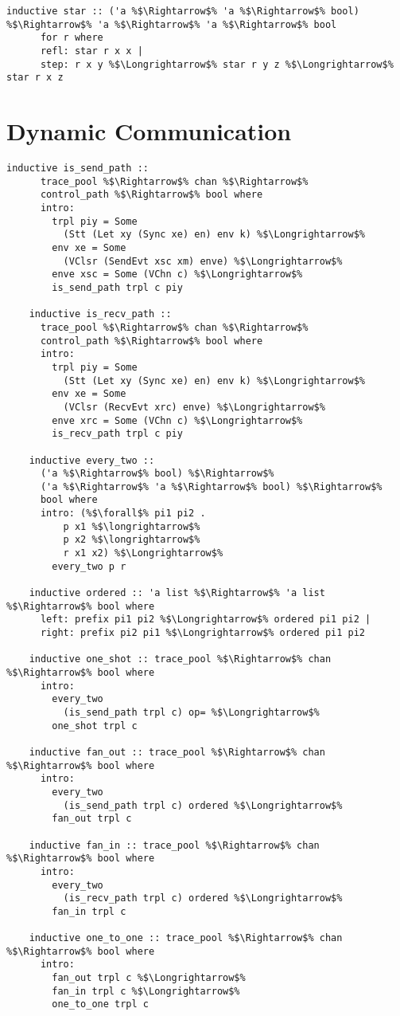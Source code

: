 \documentclass{article}
\begin{document}
  \begin{lstlisting}[style=codestyle1, escapechar=\%]
    inductive star :: ('a %$\Rightarrow$% 'a %$\Rightarrow$% bool) %$\Rightarrow$% 'a %$\Rightarrow$% 'a %$\Rightarrow$% bool
      for r where
      refl: star r x x |
      step: r x y %$\Longrightarrow$% star r y z %$\Longrightarrow$% star r x z
    \end{lstlisting}



\section{Dynamic Communication}
  
  \begin{lstlisting}[style=codestyle1, escapechar=\%]
    inductive is_send_path ::
      trace_pool %$\Rightarrow$% chan %$\Rightarrow$%
      control_path %$\Rightarrow$% bool where
      intro:
        trpl piy = Some
          (Stt (Let xy (Sync xe) en) env k) %$\Longrightarrow$%
        env xe = Some
          (VClsr (SendEvt xsc xm) enve) %$\Longrightarrow$%
        enve xsc = Some (VChn c) %$\Longrightarrow$%
        is_send_path trpl c piy

    inductive is_recv_path ::
      trace_pool %$\Rightarrow$% chan %$\Rightarrow$%
      control_path %$\Rightarrow$% bool where
      intro:
        trpl piy = Some
          (Stt (Let xy (Sync xe) en) env k) %$\Longrightarrow$%
        env xe = Some
          (VClsr (RecvEvt xrc) enve) %$\Longrightarrow$%
        enve xrc = Some (VChn c) %$\Longrightarrow$%
        is_recv_path trpl c piy

    inductive every_two ::
      ('a %$\Rightarrow$% bool) %$\Rightarrow$%
      ('a %$\Rightarrow$% 'a %$\Rightarrow$% bool) %$\Rightarrow$%
      bool where
      intro: (%$\forall$% pi1 pi2 .
          p x1 %$\longrightarrow$%
          p x2 %$\longrightarrow$%
          r x1 x2) %$\Longrightarrow$%
        every_two p r

    inductive ordered :: 'a list %$\Rightarrow$% 'a list %$\Rightarrow$% bool where
      left: prefix pi1 pi2 %$\Longrightarrow$% ordered pi1 pi2 |
      right: prefix pi2 pi1 %$\Longrightarrow$% ordered pi1 pi2

    inductive one_shot :: trace_pool %$\Rightarrow$% chan %$\Rightarrow$% bool where
      intro:
        every_two
          (is_send_path trpl c) op= %$\Longrightarrow$% 
        one_shot trpl c

    inductive fan_out :: trace_pool %$\Rightarrow$% chan %$\Rightarrow$% bool where
      intro:
        every_two
          (is_send_path trpl c) ordered %$\Longrightarrow$%
        fan_out trpl c
  
    inductive fan_in :: trace_pool %$\Rightarrow$% chan %$\Rightarrow$% bool where
      intro:
        every_two
          (is_recv_path trpl c) ordered %$\Longrightarrow$% 
        fan_in trpl c

    inductive one_to_one :: trace_pool %$\Rightarrow$% chan %$\Rightarrow$% bool where
      intro:
        fan_out trpl c %$\Longrightarrow$%
        fan_in trpl c %$\Longrightarrow$% 
        one_to_one trpl c

    \end{lstlisting}
\end{document}
